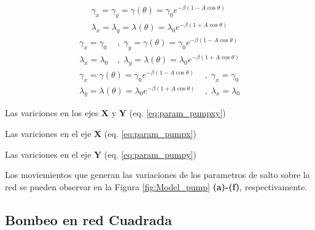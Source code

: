 \begin{align}
    \label{eq:param_pumpxy}
    \nonumber \gamma_x = \gamma_y = \gamma (\theta) = \gamma_0 e^{\displaystyle-\beta(1 - A \cos \theta )} \\ \lambda_x = \lambda_y = \lambda(\theta) = \lambda_0 e^{\displaystyle-\beta( 1 + A \cos \theta )}
\end{align}
\begin{align}
    \label{eq:param_pumpx}
    \nonumber \gamma_x =\gamma_0 \; &,\; \gamma_y = \gamma (\theta) = \gamma_0 e^{\displaystyle-\beta(1 - A \cos \theta )} \\
    \lambda_x = \lambda_0  \; &,\;  \lambda_y = \lambda(\theta) = \lambda_0 e^{\displaystyle-\beta( 1 + A \cos \theta )}
\end{align}
\begin{align}
    \label{eq:param_pumpy}
    \nonumber \gamma_x = \gamma (\theta) = \gamma_0 e^{\displaystyle-\beta(1 - A \cos \theta )}   \; &,\; \gamma_x =\gamma_0 \\
    \lambda_y = \lambda(\theta) = \lambda_0 e^{\displaystyle-\beta( 1 + A \cos \theta )} \; &,\; \lambda_x = \lambda_0  
\end{align}

Las variciones en los ejes $\mathbf{X}$ y $\mathbf{Y}$ (eq. \ref{eq:param_pumpxy})


Las variciones en el eje $\mathbf{X}$ (eq. \ref{eq:param_pumpx})


Las variciones en el eje $\mathbf{Y}$ (eq. \ref{eq:param_pumpy})

Los moviemientos que generan las variaciones de los parametros de salto sobre la red se pueden observar en la Figura \ref{fig:Model_pump} \textbf{(a)-(f)}, respectivamente.




\subsection{Bombeo en red Cuadrada}


